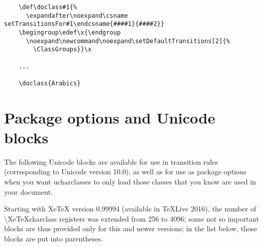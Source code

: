\documentclass{article}
\begin{document}
    \disableTransitionRules
    \begin{verbatim}
    \def\doclass#1{%
      \expandafter\noexpand\csname setTransitionsFor#1\endcsname{####1}{####2}}
    \begingroup\edef\x{\endgroup
      \noexpand\newcommand\noexpand\setDefaultTransitions[2]{%
        \ClassGroups}}\x

    ...

    \doclass{Arabics}
    \end{verbatim}
    \enableTransitionRules

  \pagebreak

  \section{Package options and Unicode blocks}

    The following Unicode blocks are available for use in transition rules (corresponding to Unicode version 10.0), as well as for use as package options when you want ucharclasses to only load those classes that you know are used in your document.

    Starting with XeTeX version 0.99994 (available in TeXLive 2016), the number of \textbackslash XeTeXcharclass registers was extended from 256 to 4096; some not so important blocks are thus provided only for this and newer versions; in the list below, those blocks are put into parentheses.
\end{document}

